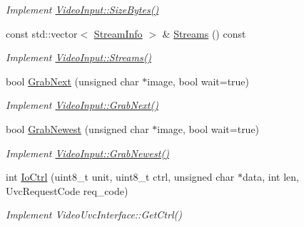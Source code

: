 \begin{DoxyCompactItemize}
\begin{DoxyCompactList}\small\item\em Implement \hyperlink{structpangolin_1_1_video_input_a93cee5c33386973a2a51165e6bdcf40b}{Video\+Input\+::\+Size\+Bytes()} \end{DoxyCompactList}\item 
const std\+::vector$<$ \hyperlink{classpangolin_1_1_stream_info}{Stream\+Info} $>$ \& \hyperlink{classpangolin_1_1_uvc_video_a265e2dd37db7df5e6494ae97c265a3dd}{Streams} () const \hypertarget{classpangolin_1_1_uvc_video_a265e2dd37db7df5e6494ae97c265a3dd}{}\label{classpangolin_1_1_uvc_video_a265e2dd37db7df5e6494ae97c265a3dd}

\begin{DoxyCompactList}\small\item\em Implement \hyperlink{structpangolin_1_1_video_input_a9030d775d699c39ab7b7ba378c007c6a}{Video\+Input\+::\+Streams()} \end{DoxyCompactList}\item 
bool \hyperlink{classpangolin_1_1_uvc_video_ac78132c9593f8c0dba98b9af38ceded2}{Grab\+Next} (unsigned char $\ast$image, bool wait=true)\hypertarget{classpangolin_1_1_uvc_video_ac78132c9593f8c0dba98b9af38ceded2}{}\label{classpangolin_1_1_uvc_video_ac78132c9593f8c0dba98b9af38ceded2}

\begin{DoxyCompactList}\small\item\em Implement \hyperlink{structpangolin_1_1_video_input_ad3d8ff59c1ec4139320097e6e1111f32}{Video\+Input\+::\+Grab\+Next()} \end{DoxyCompactList}\item 
bool \hyperlink{classpangolin_1_1_uvc_video_a8556f3460309690cdfb99ceeb19ea633}{Grab\+Newest} (unsigned char $\ast$image, bool wait=true)\hypertarget{classpangolin_1_1_uvc_video_a8556f3460309690cdfb99ceeb19ea633}{}\label{classpangolin_1_1_uvc_video_a8556f3460309690cdfb99ceeb19ea633}

\begin{DoxyCompactList}\small\item\em Implement \hyperlink{structpangolin_1_1_video_input_a4c8ac38e3c6a3f591663aeebf645e4c6}{Video\+Input\+::\+Grab\+Newest()} \end{DoxyCompactList}\item 
int \hyperlink{classpangolin_1_1_uvc_video_ae57b7dd563d9894e56ed9f644c4b7998}{Io\+Ctrl} (uint8\+\_\+t unit, uint8\+\_\+t ctrl, unsigned char $\ast$data, int len, Uvc\+Request\+Code req\+\_\+code)\hypertarget{classpangolin_1_1_uvc_video_ae57b7dd563d9894e56ed9f644c4b7998}{}\label{classpangolin_1_1_uvc_video_ae57b7dd563d9894e56ed9f644c4b7998}

\begin{DoxyCompactList}\small\item\em Implement Video\+Uvc\+Interface\+::\+Get\+Ctrl() \end{DoxyCompactList}\end{DoxyCompactItemize}
